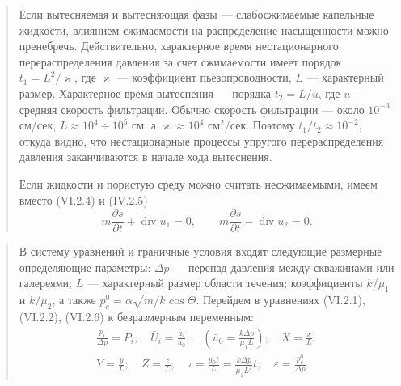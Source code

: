 \documentclass[12pt,a4paper]{article}
\DeclareMathOperator{\Div}{div}
\begin{document}
\begin{quote}\sloppy
Если вытесняемая и вытесняющая фазы --- слабосжимаемые капельные жидкости, влиянием сжимаемости на распределение насыщенности можно пренебречь. Действительно, характерное время нестационарного перераспределения давления за счет сжимаемости имеет порядок $t_1=L^2/\varkappa$, где $\varkappa$ --- коэффициент пьезопроводности, $L$ --- характерный размер. Характерное время вытеснения --- порядка $t_2=L/u$, где $u$ --- средняя скорость фильтрации. Обычно скорость фильтрации --- около $10^{-3}$ см/сек, $L\approx10^4\div10^5$ см, а $\varkappa\approx10^4$ см$^2$/сек. Поэтому $t_1/t_2\approx10^{-2}$, откуда видно, что нестационарные процессы упругого перераспределения давления заканчиваются в начале хода вытеснения.

Если жидкости и пористую среду можно считать несжимаемыми, имеем вместо (VI.2.4) и (IV.2.5)
\begin{equation}m\frac{\partial s}{\partial t}+\Div\bar u_1=0,\qquad m\frac{\partial s}{\partial t}-\Div\bar u_2=0.\tag{VI.2.6}\label{q11:eq-VI-2-6}\end{equation}

\par\nobreak{}\par
\end{quote}

\begin{quote}\sloppy
В систему уравнений и граничные условия входят следующие размерные определяющие параметры: $\Delta p$ --- перепад давления между скважинами или галереями; $L$ --- характерный размер области течения; коэффициенты $k/\mu_1$ и $k/\mu_2$, а также $p_c^0=\alpha\sqrt{m/k}\cos\Theta$. Перейдем в уравнениях (VI.2.1), (VI.2.2), (VI.2.6) к безразмерным переменным:
\[\begin{gathered}
\frac{p_i}{\Delta p}=P_i;\quad\bar U_i=\frac{\bar u_i}{u_0};\quad\left(\bar u_0=\frac{k\Delta p}{\mu_1L}\right);\quad X=\frac{x}{L};\\
Y=\frac{y}{L};\quad Z=\frac{z}{L};\quad\tau=\frac{u_0t}{L}=\frac{k\Delta p}{\mu_1L^2}t;\quad\varepsilon=\frac{p_c^0}{\Delta p}.
\end{gathered}\]

\par\nobreak{}\par
\end{quote}
\end{document}
